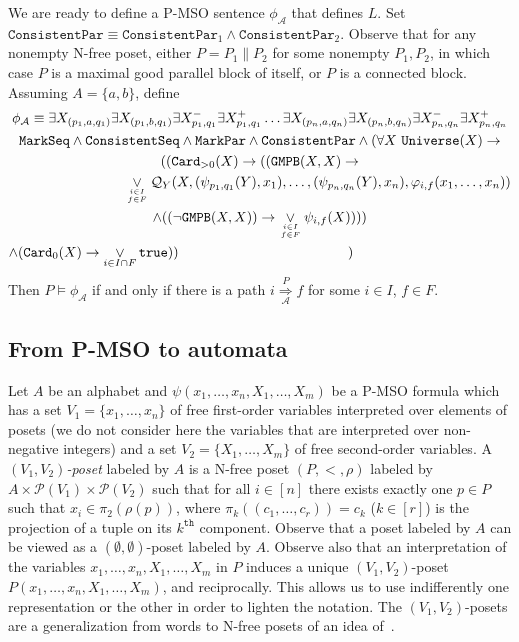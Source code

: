 \documentclass{CSML}
\begin{document}
We are ready to define a P-MSO sentence $\phi_\mathcal{A}$ that defines $L$.
Set $\texttt{ConsistentPar}\equiv\texttt{ConsistentPar}_1\land\texttt{ConsistentPar}_2$.
Observe that for any nonempty N-free poset, either $P=P_1\parallel P_2$ for some nonempty $P_1,P_2$, in which case $P$ is a maximal good parallel block of itself, or $P$ is a connected block. Assuming $A=\{a,b\}$, define
\begin{multline*}
\phi_\mathcal{A}\equiv\exists X_{(p_1,a,q_1)}\exists X_{(p_1,b,q_1)}\exists X^-_{p_1,q_1}\exists X^+_{p_1,q_1}\dots \exists X_{(p_n,a,q_n)}\exists X_{(p_n,b,q_n)}\exists X^-_{p_n,q_n}\exists X^+_{p_n,q_n}\\
\texttt{MarkSeq}\land\texttt{ConsistentSeq}\land\texttt{MarkPar}\land\texttt{ConsistentPar}
\land
( \forall X\ \texttt{Universe}(X)\rightarrow \\
  ((\texttt{Card}_{>0}(X)\rightarrow
    ((\texttt{GMPB}(X,X) \rightarrow\\\hfill \mathop\lor_{i\in I\atop f\in F} \mathcal{Q}_Y(X,(\psi_{p_1,q_1}(Y),x_1),\dots,(\psi_{p_n,q_n}(Y),x_n),\varphi_{i,f}(x_1,\dots,x_n))\\
    \land
    ((\lnot\texttt{GMPB}(X,X)) \rightarrow \mathop\lor_{i\in I\atop f\in F} \psi_{i,f}(X)))
  )\\
  \land
  (\texttt{Card}_{0}(X)\rightarrow \mathop\lor_{i\in I\cap F}\texttt{true}
  ))\hskip4.3cm
)\hskip4cm
\end{multline*}
Then $P\models\phi_\mathcal{A}$ if and only if there is a path $i \mathop{\Longrightarrow}\limits_{\mathcal{A}}^{P} f$ for some $i\in I$, $f\in F$.

\subsection{From P-MSO to automata}

Let $A$ be an alphabet and $\psi(x_1,\dots,x_n,X_1,\dots,X_m)$ be a P-MSO formula which has a set $V_1=\{x_1,\dots,x_n\}$ of free first-order variables interpreted over elements of posets (we do not consider here the variables that are interpreted over non-negative integers) and a set $V_2=\{X_1,\dots,X_m\}$ of free second-order variables. A \emph{$(V_1,V_2)$-poset} labeled by $A$ is a N-free poset $(P,<,\rho)$ labeled by  $A\times {\mathcal P}(V_1)\times {\mathcal P}(V_2)$ such that for all $i\in[n]$ there exists exactly one $p\in P$ such that $x_i\in\pi_2(\rho(p))$, where $\pi_k((c_1,\dots,c_r))=c_k$ ($k\in[r]$) is the projection of a tuple on its $k^\texttt{th}$ component.
Observe that a poset labeled by $A$ can be viewed as a $(\emptyset,\emptyset)$-poset labeled by $A$.
Observe also that an interpretation of the variables $x_{1},\dots,x_{n},X_{1},\dots,X_{m}$ in $P$ induces a unique $(V_1,V_2)$-poset $P(x_{1},\dots,x_{n},X_{1},\dots,X_{m})$, and reciprocally. This allows us to use indifferently one representation or the other in order to lighten the notation.
The $(V_1,V_2)$-posets are a generalization from words to N-free posets of an idea of~\cite{PP86}.
\end{document}
